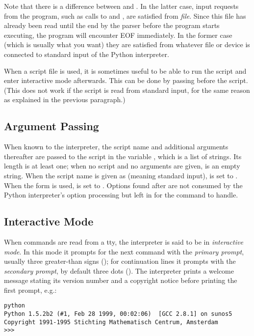 \documentclass{manual}
\begin{document}
Note that there is a difference between  and
.  In the latter case, input requests from the
program, such as calls to  and , are
satisfied from \emph{file}.  Since this file has already been read
until the end by the parser before the program starts executing, the
program will encounter EOF immediately.  In the former case (which is
usually what you want) they are satisfied from whatever file or device
is connected to standard input of the Python interpreter.

When a script file is used, it is sometimes useful to be able to run
the script and enter interactive mode afterwards.  This can be done by
passing  before the script.  (This does not work if the script
is read from standard input, for the same reason as explained in the
previous paragraph.)

\subsection{Argument Passing \label{argPassing}}

When known to the interpreter, the script name and additional
arguments thereafter are passed to the script in the variable
, which is a list of strings.  Its length is at least
one; when no script and no arguments are given,  is
an empty string.  When the script name is given as  (meaning 
standard input),  is set to .  When the
 form is used,  is set to
.  Options found after  are not consumed
by the Python interpreter's option processing but left in
 for the command to handle.

\subsection{Interactive Mode \label{interactive}}

When commands are read from a tty, the interpreter is said to be in
\emph{interactive mode}.  In this mode it prompts for the next command
with the \emph{primary prompt}, usually three greater-than signs
(\samp{>>>~}); for continuation lines it prompts with the
\emph{secondary prompt}, by default three dots ().
The interpreter prints a welcome message stating its version number
and a copyright notice before printing the first prompt, e.g.:

\begin{verbatim}
python
Python 1.5.2b2 (#1, Feb 28 1999, 00:02:06)  [GCC 2.8.1] on sunos5
Copyright 1991-1995 Stichting Mathematisch Centrum, Amsterdam
>>>
\end{verbatim}
\end{document}
